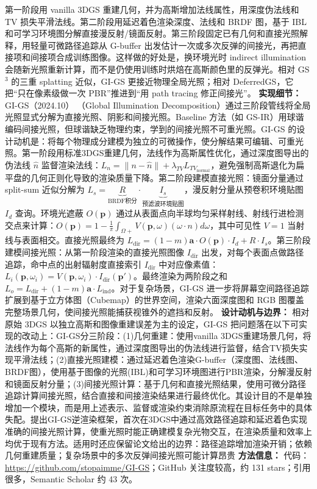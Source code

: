 第一阶段用 vanilla 3DGS 重建几何，并为高斯增加法线属性，用深度伪法线和 TV 损失平滑法线。第二阶段用延迟着色渲染深度、法线和 BRDF 图，基于 IBL 和可学习环境图分解直接漫反射/镜面反射。第三阶段固定已有几何和直接光照解释，用轻量可微路径追踪从 G-buffer 出发估计一次或多次反弹的间接光，再把直接项和间接项合成训练图像。这样做的好处是，换环境光时 indirect illumination 会随新光照重新计算，而不是仍使用训练时烘焙在高斯颜色里的反弹光。相对 GS$^3$ 的三重 splatting 近似，GI-GS 更接近物理全局光照；相对 DeferredGS，它把“只在像素级做一次 PBR”推进到“用 path tracing 修正间接光”。
\textbf{实现细节：} GI-GS（2024.10） （Global Illumination Decomposition）通过三阶段管线将全局光照显式分解为直接光照、阴影和间接光照。Baseline 方法（如 GS-IR）用球谐编码间接光照，但球谐缺乏物理约束，学到的间接光照不可重光照。GI-GS 的设计动机是：将每个物理成分建模为独立的可微操作，使分解结果可编辑、可重光照。第一阶段用标准3DGS重建几何，法线作为高斯属性优化，通过深度图导出的伪法线 $\hat{n}$ 监督渲染法线：$L_n = \|n - \hat{n}\| + \lambda_{TV} L_{TV_{\mathrm{normal}}}$，避免强制高斯退化为扁平盘的几何正则化导致的渲染质量下降。第二阶段建模直接光照：镜面分量通过 split-sum 近似分解为 $L_s = \underbrace{R}_{\mathrm{BRDF积分}} \cdot \underbrace{I_s}_{\mathrm{预滤波环境贴图}}$，漫反射分量从预卷积环境贴图 $I_d$ 查询。环境光遮蔽 $O(\mathbf{p})$ 通过从表面点向半球均匀采样射线、射线行进检测交点来计算：$O(\mathbf{p}) = 1 - \frac{1}{\pi}\int_{\Omega^{}+} V(\mathbf{p}, \omega) (\omega \cdot n) d\omega$，其中可见性 $V=1$ 当射线与表面相交。直接光照最终为 $L_{\mathrm{dir}} = (1-m)\boldsymbol{a} \cdot O(\mathbf{p}) \cdot I_d + R \cdot I_s$。第三阶段建模间接光照：从第一阶段渲染的直接光照图像 $I_{\mathrm{dir}}$ 出发，对每个表面点做路径追踪，命中点的出射辐射度直接索引 $I_{\mathrm{dir}}$ 中对应像素值：$L_i(\mathbf{p}, \omega_i) = V(\mathbf{p}, \omega_i) \cdot I_{\mathrm{dir}}(\mathbf{p}')$。最终渲染为两阶段之和 $L_o = L_{\mathrm{dir}} + (1-m)\boldsymbol{a} \cdot L_{\mathrm{ind}}$。对于复杂场景，GI-GS 进一步将屏幕空间路径追踪扩展到基于立方体图（Cubemap）的世界空间，渲染六面深度图和 RGB 图覆盖完整场景几何，使间接光照能捕获视锥外的遮挡和反射。
\textbf{设计动机与边界：} 相对原始 3DGS 以独立高斯和图像重建误差为主的设定，GI-GS 把问题落在以下可实现的改动上：GI-GS分三阶段：(1)几何重建：使用vanilla 3DGS重建场景几何，将法线作为每个高斯的新属性，通过深度图导出的伪法线进行监督，结合TV损失实现平滑法线；(2)直接光照建模：通过延迟着色渲染G-buffer（深度图、法线图、BRDF图），使用基于图像的光照(IBL)和可学习环境图进行PBR渲染，分解漫反射和镜面反射分量；(3)间接光照计算：基于几何和直接光照结果，使用可微分路径追踪计算间接光照，结合直接和间接渲染结果进行最终优化。其设计目的不是单独增加一个模块，而是用上述表示、监督或渲染约束消除原流程在目标任务中的具体失配。提出GI-GS逆渲染框架，首次在3DGS中通过高效路径追踪和延迟着色实现准确的间接光照计算，使重光照时能正确建模复杂光物交互，在渲染质量和效率上均优于现有方法。适用时还应保留论文给出的边界：路径追踪增加渲染开销；依赖几何重建质量；复杂场景中的多次反弹间接光照可能计算昂贵
\textbf{方法信息：} 代码：\url{https://github.com/stopaimme/GI-GS}；GitHub 关注度较高，约 131 stars；引用很多，Semantic Scholar 约 43 次。



